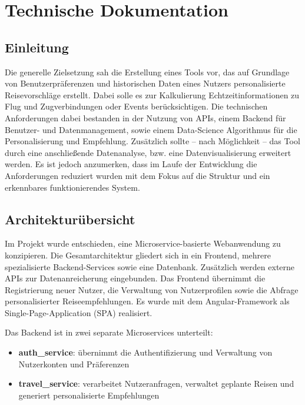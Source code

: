 \section{Technische Dokumentation}

\subsection{Einleitung}

Die generelle Zielsetzung sah die Erstellung eines Tools vor, das auf Grundlage von Benutzerpräferenzen und historischen Daten eines Nutzers personalisierte Reisevorschläge erstellt. Dabei solle es zur Kalkulierung Echtzeitinformationen zu Flug und Zugverbindungen oder Events berücksichtigen. 
Die technischen Anforderungen dabei bestanden in der Nutzung von APIs, einem Backend für Benutzer- und Datenmanagement, sowie einem Data-Science Algorithmus für die Personalisierung und Empfehlung.  
Zusätzlich sollte – nach Möglichkeit – das Tool durch eine anschließende Datenanalyse, bzw. eine Datenvisualisierung erweitert werden.  
Es ist jedoch anzumerken, dass im Laufe der Entwicklung die Anforderungen reduziert wurden mit dem Fokus auf die Struktur und ein erkennbares funktionierendes System.

\subsection{Architekturübersicht}

Im Projekt wurde entschieden, eine Microservice-basierte Webanwendung zu konzipieren. Die Gesamtarchitektur gliedert sich in ein Frontend, mehrere spezialisierte Backend-Services sowie eine Datenbank. Zusätzlich werden externe APIs zur Datenanreicherung eingebunden.  
Das Frontend übernimmt die Registrierung neuer Nutzer, die Verwaltung von Nutzerprofilen sowie die Abfrage personalisierter Reiseempfehlungen. Es wurde mit dem Angular-Framework als Single-Page-Application (SPA) realisiert.  

Das Backend ist in zwei separate Microservices unterteilt:
\begin{itemize}
  \item \textbf{auth\_service}: übernimmt die Authentifizierung und Verwaltung von Nutzerkonten und Präferenzen
  \item \textbf{travel\_service}: verarbeitet Nutzeranfragen, verwaltet geplante Reisen und generiert personalisierte Empfehlungen
\end{itemize}

